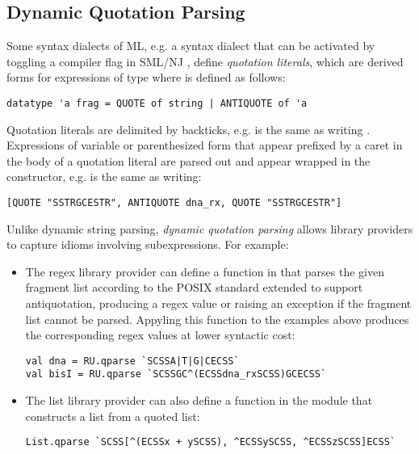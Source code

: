 \subsection{Dynamic Quotation Parsing}\label{sec:dynamic-quotation}
Some syntax dialects of ML, e.g. a syntax dialect that can be activated by toggling a compiler flag in SML/NJ \cite{SML/Quote,conf/icfp/Slind91}, define \emph{quotation literals}, which are derived forms for expressions of type  where  is defined as follows:
\begin{lstlisting}[numbers=none]
datatype 'a frag = QUOTE of string | ANTIQUOTE of 'a
\end{lstlisting}
Quotation literals are delimited by backticks, e.g.  is the same as writing . Expressions of variable or parenthesized form that appear prefixed by a caret in the body of a quotation literal  are parsed out and appear wrapped in the  constructor, e.g.   is the same as writing:
\begin{lstlisting}[numbers=none]
[QUOTE "SSTRGCESTR", ANTIQUOTE dna_rx, QUOTE "SSTRGCESTR"]
\end{lstlisting}
Unlike dynamic string parsing, \emph{dynamic quotation parsing} allows library providers to capture idioms involving subexpressions. For example:
\begin{itemize}
\item The regex library provider can define a function  in  that parses the given fragment list according to the POSIX standard extended to support antiquotation, producing a regex value or raising an exception if the fragment list cannot be parsed. Appyling this function to the examples above produces the corresponding regex values at lower syntactic cost:
\begin{lstlisting}[numbers=none]
val dna = RU.qparse `SCSSA|T|G|CECSS`
val bisI = RU.qparse `SCSSGC^(ECSSdna_rxSCSS)GCECSS`
\end{lstlisting}
\item The list library provider can also define a function  in the  module that constructs a list from a quoted list:
\begin{lstlisting}[numbers=none]
List.qparse `SCSS[^(ECSSx + ySCSS), ^ECSSySCSS, ^ECSSzSCSS]ECSS`
\end{lstlisting}
\end{itemize}

